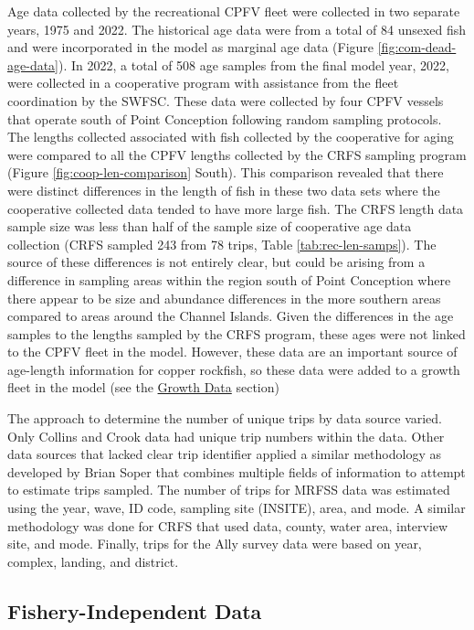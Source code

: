 \documentclass[11pt,
  english,
  letterpaper,
]{article}
\begin{document}
Age data collected by the recreational CPFV fleet were collected in two separate years, 1975 and 2022. The historical age data were from a total of 84 unsexed fish and were incorporated in the model as marginal age data (Figure \ref{fig:com-dead-age-data}). In 2022, a total of 508 age samples from the final model year, 2022, were collected in a cooperative program with assistance from the fleet coordination by the SWFSC. These data were collected by four CPFV vessels that operate south of Point Conception following random sampling protocols. The lengths collected associated with fish collected by the cooperative for aging were compared to all the CPFV lengths collected by the CRFS sampling program (Figure \ref{fig:coop-len-comparison} South). This comparison revealed that there were distinct differences in the length of fish in these two data sets where the cooperative collected data tended to have more large fish. The CRFS length data sample size was less than half of the sample size of cooperative age data collection (CRFS sampled 243 from 78 trips, Table \ref{tab:rec-len-samps}). The source of these differences is not entirely clear, but could be arising from a difference in sampling areas within the region south of Point Conception where there appear to be size and abundance differences in the more southern areas compared to areas around the Channel Islands. Given the differences in the age samples to the lengths sampled by the CRFS program, these ages were not linked to the CPFV fleet in the model. However, these data are an important source of age-length information for copper rockfish, so these data were added to a growth fleet in the model (see the \protect\hyperlink{growth-data}{Growth Data} section)

The approach to determine the number of unique trips by data source varied. Only Collins and Crook data had unique trip numbers within the data. Other data sources that lacked clear trip identifier applied a similar methodology as developed by Brian Soper that combines multiple fields of information to attempt to estimate trips sampled. The number of trips for MRFSS data was estimated using the year, wave, ID code, sampling site (INSITE), area, and mode. A similar methodology was done for CRFS that used data, county, water area, interview site, and mode. Finally, trips for the Ally survey data were based on year, complex, landing, and district.

\hypertarget{fishery-independent-data}{%
\subsection{Fishery-Independent Data}\label{fishery-independent-data}}
\end{document}
